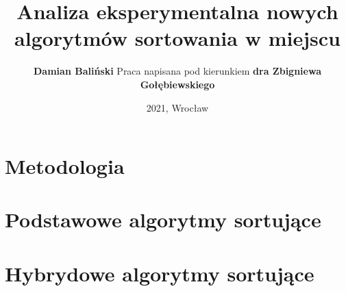 \documentclass[xcolor=dvipsnames]{beamer}
\title{Analiza eksperymentalna nowych algorytmów sortowania w miejscu}
\author{
	\textbf{Damian Baliński}
	\newline \newline
	Praca napisana pod kierunkiem 
	\newline
	\textbf{dra Zbigniewa Gołębiewskiego}
}
\date{2021, Wrocław}
\begin{document}
\begin{frame}[plain]{}
	\titlepage
\end{frame}

\section{Metodologia}



\section{Podstawowe algorytmy sortujące}



\section{Hybrydowe algorytmy sortujące}







\end{document}
